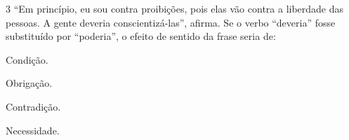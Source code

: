 

\num{3} ``Em princípio, eu sou contra proibições, pois elas vão contra a
liberdade das pessoas. A gente deveria conscientizá-las'', afirma. Se o
verbo ``deveria'' fosse substituído por ``poderia'', o efeito de sentido
da frase seria de:

\begin{escolha}
\item Condição.
\item Obrigação.
\item Contradição.
\item Necessidade.
\end{escolha}


